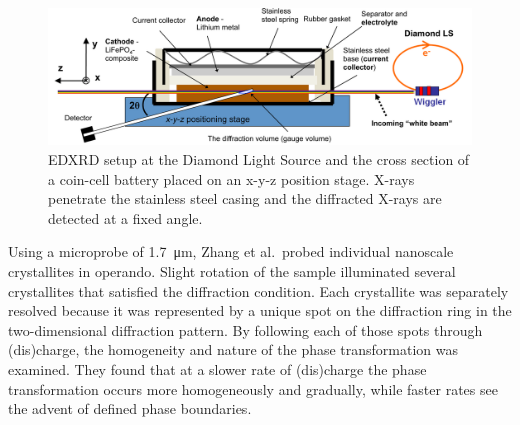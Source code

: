 \documentclass[journal=cmatex,manuscript=perspective]{achemso}
\begin{document}
\begin{figure}
  \includegraphics[width=\textwidth]{strobridge2015.png}
  \caption{ EDXRD setup at the Diamond Light Source and the
    cross section of a coin-cell battery placed on an x-y-z position
    stage. X-rays penetrate the stainless steel casing and the
    diffracted X-rays are detected at a fixed angle.\cite{strobridge2015}}
  \label{figure:strobridge2015}
\end{figure}

Using a microprobe of \SI{1.7}{\micro\meter}, Zhang et al.\ probed
individual nanoscale  crystallites in operando. Slight
rotation of the sample illuminated several crystallites that satisfied
the diffraction condition. Each crystallite was separately resolved
because it was represented by a unique spot on the diffraction ring in
the two-dimensional diffraction pattern. By following each of those
spots through (dis)charge, the homogeneity and nature of the phase
transformation was examined. They found that at a slower rate of
(dis)charge the phase transformation occurs more homogeneously and
gradually, while faster rates see the advent of defined phase
boundaries\cite{zhang2015-2}.
\end{document}
